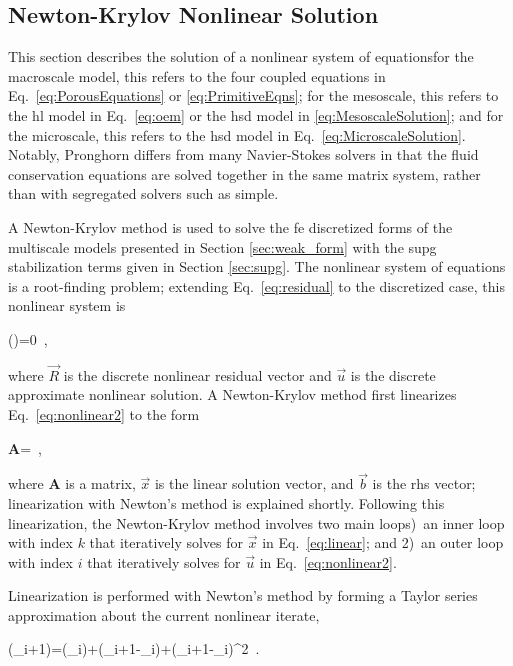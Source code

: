 \subsection{Newton-Krylov Nonlinear Solution}
\label{sec:nonlinear}

This section describes the solution of a nonlinear system of equations\mdash for the macroscale model, this refers to the four coupled equations in Eq.\ \eqref{eq:PorousEquations} or \eqref{eq:PrimitiveEqns}; for the mesoscale, this refers to the \gls{hl} model in Eq.\ \eqref{eq:oem} or the \gls{hsd} model in \eqref{eq:MesoscaleSolution}; and for the microscale, this refers to the \gls{hsd} model in Eq.\ \eqref{eq:MicroscaleSolution}. Notably, Pronghorn differs from many Navier-Stokes solvers in that the fluid conservation equations are solved together in the same matrix system, rather than with segregated solvers such as \gls{simple}.

A Newton-Krylov method is used to solve the \gls{fe} discretized forms of the multiscale models presented in Section \ref{sec:weak_form} with the \gls{supg} stabilization terms given in Section \ref{sec:supg}. The nonlinear system of equations is a root-finding problem; extending Eq.\ \eqref{eq:residual} to the discretized case, this nonlinear system is

\beq
\label{eq:nonlinear2}
()=0\ ,
\eeq

\noindent where \(\vec{R}\) is the discrete nonlinear residual vector and \(\vec{u}\) is the discrete approximate nonlinear solution. A Newton-Krylov method first linearizes Eq.\ \eqref{eq:nonlinear2} to the form

\beq
\label{eq:linear}
\textbf{A}=\ ,
\eeq

\noindent where \(\textbf{A}\) is a matrix, \(\vec{x}\) is the linear solution vector, and \(\vec{b}\) is the \gls{rhs} vector; linearization with Newton's method is explained shortly. Following this linearization, the Newton-Krylov method involves two main loops)~an inner loop with index \(k\) that iteratively solves for \(\vec{x}\) in Eq.\ \eqref{eq:linear}; and 2)~an outer loop with index \(i\) that iteratively solves for \(\vec{u}\) in Eq.\ \eqref{eq:nonlinear2}.

Linearization is performed with Newton's method by forming a Taylor series approximation about the current nonlinear iterate,

\beq
\label{eq:TaylorSeriesResidual}
(_{i+1})=(_i)+(_{i+1}-_i)+(_{i+1}-_i)^2\ .
\eeq

